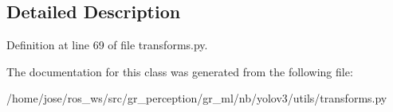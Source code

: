 \subsection{Detailed Description}


Definition at line 69 of file transforms.\+py.



The documentation for this class was generated from the following file\+:\begin{DoxyCompactItemize}
\item 
/home/jose/ros\+\_\+ws/src/gr\+\_\+perception/gr\+\_\+ml/nb/yolov3/utils/transforms.\+py\end{DoxyCompactItemize}
